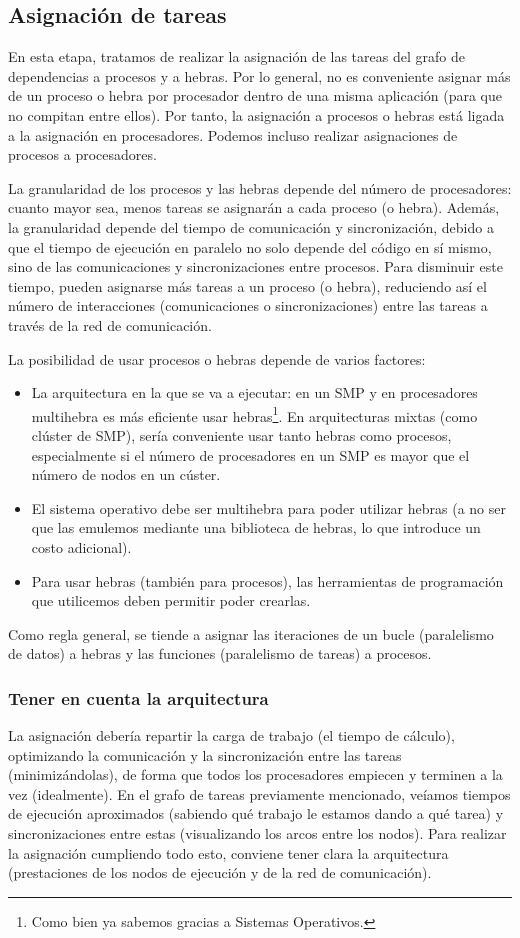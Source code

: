 \subsection{Asignación de tareas} 
En esta etapa, tratamos de realizar la asignación de las tareas del grafo de dependencias a procesos y a hebras. Por lo general, no es conveniente asignar más de un proceso o hebra por procesador dentro de una misma aplicación (para que no compitan entre ellos). Por tanto, la asignación a procesos o hebras está ligada a la asignación en procesadores. Podemos incluso realizar asignaciones de procesos a procesadores. 

La granularidad de los procesos y las hebras depende del número de procesadores: cuanto mayor sea, menos tareas se asignarán a cada proceso (o hebra). Además, la granularidad depende del tiempo de comunicación y sincronización, debido a que el tiempo de ejecución en paralelo no solo depende del código en sí mismo, sino de las comunicaciones y sincronizaciones entre procesos. Para disminuir este tiempo, pueden asignarse más tareas a un proceso (o hebra), reduciendo así el número de interacciones (comunicaciones o sincronizaciones) entre las tareas a través de la red de comunicación. 

La posibilidad de usar procesos o hebras depende de varios factores:
\begin{itemize}
    \item La arquitectura en la que se va a ejecutar: en un SMP y en procesadores multihebra es más eficiente usar hebras\footnote{Como bien ya sabemos gracias a Sistemas Operativos.}. En arquitecturas mixtas (como clúster de SMP), sería conveniente usar tanto hebras como procesos, especialmente si el número de procesadores en un SMP es mayor que el número de nodos en un cúster.
    \item El sistema operativo debe ser multihebra para poder utilizar hebras (a no ser que las emulemos mediante una biblioteca de hebras, lo que introduce un costo adicional).
    \item Para usar hebras (también para procesos), las herramientas de programación que utilicemos deben permitir poder crearlas.
\end{itemize}
Como regla general, se tiende a asignar las iteraciones de un bucle (paralelismo de datos) a hebras y las funciones (paralelismo de tareas) a procesos.

\subsubsection{Tener en cuenta la arquitectura}
La asignación debería repartir la carga de trabajo (el tiempo de cálculo), optimizando la comunicación y la sincronización entre las tareas (minimizándolas), de forma que todos los procesadores empiecen y terminen a la vez (idealmente). En el grafo de tareas previamente mencionado, veíamos tiempos de ejecución aproximados (sabiendo qué trabajo le estamos dando a qué tarea) y sincronizaciones entre estas (visualizando los arcos entre los nodos). Para realizar la asignación cumpliendo todo esto, conviene tener clara la arquitectura (prestaciones de los nodos de ejecución y de la red de comunicación).

